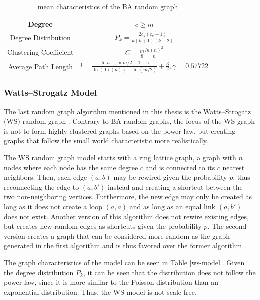 \begin{table}[ht!]
    \centering
    \begin{tabular}{|c | c |} 
     \hline
     Degree & $c\geq m$ \\ 
     \hline
     Degree Distribution & 
     $P_k = \frac{2c_k(c_k+1)}{k(k+1)(k+2)}$ \\ 
     \hline
     Clustering Coefficient \cite{ba_cluster_coeff} & 
     $C=\frac{m}{8}\frac{ln(n)^2}{n}$ \\ 
     \hline
     Average Path Length \cite{averagepath}& 
     $l = \frac{\ln{n}- \ln{m/2} - 1 - \gamma}{\ln(\ln(n))+\ln{(m/2)}} + \frac{3}{2}, 
     \gamma=0.57722$ \\ 
     \hline
    \end{tabular}
    \caption{mean characteristics of the BA random graph \cite{basicnetwork}}
    \label{ba-model}
\end{table}

\subsubsection{Watts–Strogatz Model}
The last random graph algorithm mentioned in this thesis 
is the Watts–Strogatz (WS) random graph \cite{wattsmodel}.
Contrary to BA random graphs, the focus of the WS graph is not to 
form highly clustered graphs based on the power law, but creating graphs
that follow the small world characteristic more realistically.

The WS random graph model starts with a ring lattice graph, a graph 
with $n$ nodes where each node has the same degree $c$ and 
is connected to its $c$ nearest neighbors. Then, each edge $(a, b)$
may be rewired given the probability $p$, thus reconnecting the edge to  $(a, b')$
instead and creating a shortcut between the two non-neighboring vertices.
Furthermore, the new edge may only be created as long as it does not create
a loop $(a, a)$ and as long as an equal link $(a, b')$ does not exist.
Another version of this algorithm does not rewire existing edges,
but creates new random edges as shortcuts given the probability $p$.
The second version creates a graph that can be considered more 
\glqq random\grqq{} as the graph generated in the first algorithm and is
thus favored over the former algorithm \cite{basicnetwork}.

The graph characteristics of the model can be seen
in Table \ref{ws-model}. Given the degree distribution $P_k$, it can be seen
that the distribution does not follow the power law, since it is more similar
to the Poisson distribution than an exponential distribution. Thus, the WS model
is not scale-free.

